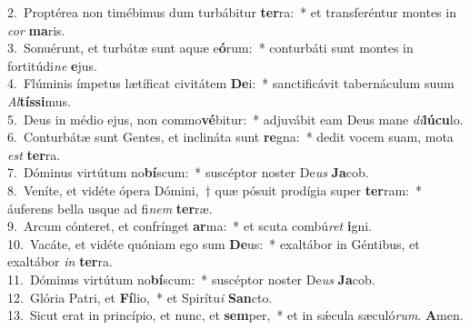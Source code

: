 {2.~}Proptérea non timébimus dum turbábitur \textbf{ter}ra:~* et transferéntur montes in \textit{cor} \textbf{ma}ris.\\
{3.~}Sonuérunt, et turbátæ sunt aquæ e\textbf{ó}rum:~* conturbáti sunt montes in fortitúdi\textit{ne} \textbf{e}jus.\\
{4.~}Flúminis ímpetus lætíficat civitátem \textbf{De}i:~* sanctificávit tabernáculum suum \textit{Al}\textbf{tís}\textbf{si}mus.\\
{5.~}Deus in médio ejus, non commo\textbf{vé}bitur:~* adjuvábit eam Deus mane \textit{di}\textbf{lú}\textbf{cu}lo.\\
{6.~}Conturbátæ sunt Gentes, et inclináta sunt \textbf{re}gna:~* dedit vocem suam, mota \textit{est} \textbf{ter}ra.\\
{7.~}Dóminus virtútum no\textbf{bí}scum:~* suscéptor noster De\textit{us} \textbf{Ja}cob.\\
{8.~}Veníte, et vidéte ópera Dómini,~† quæ pósuit prodígia super \textbf{ter}ram:~* áuferens bella usque ad fi\textit{nem} \textbf{ter}ræ.\\
{9.~}Arcum cónteret, et confrínget \textbf{ar}ma:~* et scuta combú\textit{ret} \textbf{i}gni.\\
{10.~}Vacáte, et vidéte quóniam ego sum \textbf{De}us:~* exaltábor in Géntibus, et exaltábor \textit{in} \textbf{ter}ra.\\
{11.~}Dóminus virtútum no\textbf{bí}scum:~* suscéptor noster De\textit{us} \textbf{Ja}cob.\\
{12.~}Glória Patri, et \textbf{Fí}lio,~* et Spirítu\textit{i} \textbf{San}cto.\\
{13.~}Sicut erat in princípio, et nunc, et \textbf{sem}per,~* et in sǽcula sæculó\textit{rum}. \textbf{A}men.\\
